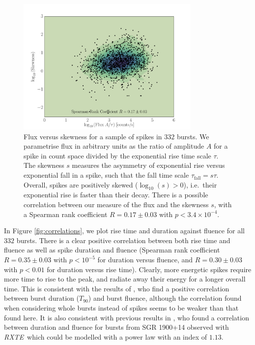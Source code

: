 \documentclass[12pt]{emulateapj}
\newcommand{\project}[1]{\textsl{#1}}
\newcommand{\rxte}{\project{RXTE}}
\begin{document}
\begin{figure}[htbp]
\begin{center}
\includegraphics[width=9cm]{f8.pdf}%
\caption{Flux versus skewness for a sample of spikes in $332$ bursts. We parametrise flux in arbitrary units as the ratio of amplitude $A$ 
for a spike in count space divided by the exponential rise time scale $\tau$. The skewness $s$ measures the asymmetry
of exponential rise versus exponential fall in a spike, such that the fall time scale $\tau_{\mathrm{fall}} = s\tau$. Overall, spikes are positively skewed ($\log_{10}{(s)} > 0$), i.e.\ their
exponential rise is faster than their decay. There is a possible correlation between our measure of the flux and the skewness $s$, with a Spearman rank coefficient $R = 0.17 \pm 0.03$ with $p < 3.4 \times 10^{-4}$.}
\label{fig:skewness}
\end{center}
\end{figure}


In Figure \ref{fig:correlations}, we plot rise time and duration against fluence for all $332$ bursts. There is a clear positive
correlation between both rise time and fluence as well as spike duration and fluence (Spearman rank coefficient $R = 0.35\pm0.03$ with $p < 10^{-5}$ for duration versus fluence,
and $R = 0.30\pm0.03$ with $p < 0.01$ for duration versus rise time). Clearly, more energetic spikes require more time to rise to the peak,
and radiate away their energy for a longer overall time. This is consistent with the results of \citet{vanderhorst2012}, who find a positive correlation between burst duration ($T_{90}$)
and burst fluence, although the correlation found when considering whole bursts instead of spikes seems to be weaker than that found here. It is also consistent with 
previous results in \citet{gogus1999}, who found a correlation between
duration and fluence for bursts from SGR 1900+14 observed with \rxte\, which could be modelled with a power law with an index of $1.13$. 
\end{document}
